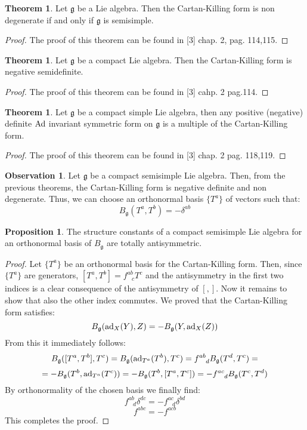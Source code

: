 \documentclass[12pt,a4paper]{report}
\theoremstyle{definition}
\theoremstyle{Theorem}
\newtheorem{Theo}[Def]{Theorem}
\newtheorem{Prop}[Def]{Proposition}
\theoremstyle{definition}
\theoremstyle{definition}
\newtheorem{Obs}[Def]{Observation}
\begin{document}
	\begin{Theo}\label{Theo_2.8.2}
		Let $\mathfrak{g}$ be a Lie algebra. Then the Cartan-Killing form is non degenerate if and only if $\mathfrak{g}$ is semisimple.
	\end{Theo}
	\begin{proof}
		The proof of this theorem can be found in [3] chap. 2, pag. 114,115.
	\end{proof}
	\begin{Theo}
		Let $\mathfrak{g}$ be a compact Lie algebra. Then the Cartan-Killing form is negative semidefinite.
	\end{Theo}
	\begin{proof}
		The proof of this theorem can be found in [3] cahp. 2 pag.114.
	\end{proof}
	\begin{Theo}
		Let $\mathfrak{g}$ be a compact simple Lie algebra, then any positive (negative) definite $\hbox{Ad}$ invariant symmetric form on $\mathfrak{g}$ is a multiple of the Cartan-Killing form.
	\end{Theo}
	\begin{proof}
		The proof of this theorem can be found in [3] chap. 2 pag. 118,119.
	\end{proof}
	\begin{Obs}
		Let $\mathfrak{g}$ be a compact semisimple Lie algebra. Then, from the previous theorems, the Cartan-Killing form is negative definite and non degenerate. Thus, we can choose an orthonormal basis $\{T^a\}$ of vectors such that:
		$$B_{\mathfrak{g}}(T^a,T^b)=-\delta^{ab}$$
	\end{Obs}
	\begin{Prop}\label{Prop_2.8.3}
		The structure constants of a compact semisimple Lie algebra for an orthonormal basis of $B_\mathfrak{g}$ are totally antisymmetric.
	\end{Prop}
	\begin{proof}
		Let $\{T^a\}$ be an orthonormal basis for the Cartan-Killing form. Then, since $\{T^a\}$ are generators, $[T^a,T^b]=f^{ab}_{\hspace{9pt}c}T^c$ and the antisymmetry in the first two indices is a clear consequence of the antisymmetry of $[,]$. Now it remains to show that also the other index commutes. 
		We proved that the Cartan-Killing form satisfies:
		$$B_\mathfrak{g}(\hbox{ad}_X(Y),Z)=-B_\mathfrak{g}(Y,\hbox{ad}_X(Z))$$
		From this it immediately follows:
		$$B_\mathfrak{g}([T^a,T^b],T^c)=B_\mathfrak{g}(\hbox{ad}_{T^a}(T^b),T^c)=f^{ab}_{\hspace{9pt}d}B_\mathfrak{g}(T^d,T^c)=$$
		$$=-B_\mathfrak{g}(T^b,\hbox{ad}_{T^a}(T^c))=-B_\mathfrak{g}(T^b,[T^a,T^c])=-f^{ac}_{\hspace{9pt}d}B_\mathfrak{g}(T^c,T^d)$$
		By orthonormality of the chosen basis we finally find:
		$$f^{ab}_{\hspace{9pt}d}\delta^{dc}=-f^{ac}_{\hspace{9pt}d}\delta^{bd}$$
		$$f^{abc}=-f^{acb}$$
		This completes the proof.
	\end{proof}
\end{document}
